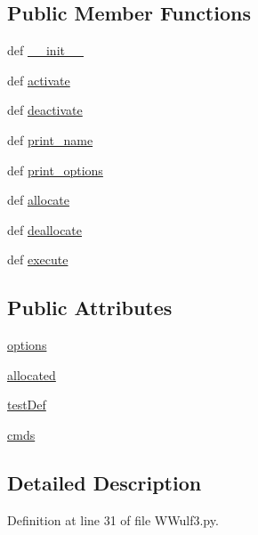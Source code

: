 \subsection*{Public Member Functions}
\begin{DoxyCompactItemize}
\item 
def \hyperlink{class_w_wulf3_1_1_w_wulf3_a796bd38c05021cfe1058ece9a27a2df4}{\-\_\-\-\_\-init\-\_\-\-\_\-}
\item 
def \hyperlink{class_w_wulf3_1_1_w_wulf3_ae3ed31bec61b4caf00f9f96f6e05ffa1}{activate}
\item 
def \hyperlink{class_w_wulf3_1_1_w_wulf3_a3eafeb23e8b080a556a9817b93092c18}{deactivate}
\item 
def \hyperlink{class_w_wulf3_1_1_w_wulf3_a9054ae7fc728370cdbf0fc3521332e49}{print\-\_\-name}
\item 
def \hyperlink{class_w_wulf3_1_1_w_wulf3_ae507b747f83b985ee062daecc9538f17}{print\-\_\-options}
\item 
def \hyperlink{class_w_wulf3_1_1_w_wulf3_a190419acb6dae4278ac923171e0f16e8}{allocate}
\item 
def \hyperlink{class_w_wulf3_1_1_w_wulf3_aeeedd5c98d7ed91c4f0beb92a19e23bb}{deallocate}
\item 
def \hyperlink{class_w_wulf3_1_1_w_wulf3_a2320c2c37a10d678a6d35ffab6096385}{execute}
\end{DoxyCompactItemize}
\subsection*{Public Attributes}
\begin{DoxyCompactItemize}
\item 
\hyperlink{class_w_wulf3_1_1_w_wulf3_adff5ffd43f8b68d49c7b45ab48d7b428}{options}
\item 
\hyperlink{class_w_wulf3_1_1_w_wulf3_ad83bab03cfcdab3a5b689a0958db19e8}{allocated}
\item 
\hyperlink{class_w_wulf3_1_1_w_wulf3_a9e8732432df9211bd64454c4c0e04098}{test\-Def}
\item 
\hyperlink{class_w_wulf3_1_1_w_wulf3_afb4fb9db2456e29872155d9b8738418f}{cmds}
\end{DoxyCompactItemize}


\subsection{Detailed Description}


Definition at line 31 of file W\-Wulf3.\-py.



